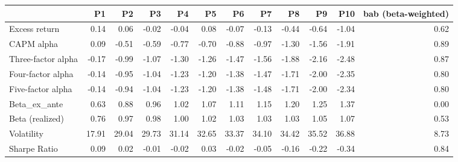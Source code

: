 \begin{tabular}{lrrrrrrrrrrr}
\toprule
{} &     P1 &     P2 &     P3 &     P4 &     P5 &     P6 &     P7 &     P8 &     P9 &    P10 &  bab (beta-weighted) \\
\midrule
Excess return      &   0.14 &   0.06 &  -0.02 &  -0.04 &   0.08 &  -0.07 &  -0.13 &  -0.44 &  -0.64 &  -1.04 &                 0.62 \\
CAPM alpha         &   0.09 &  -0.51 &  -0.59 &  -0.77 &  -0.70 &  -0.88 &  -0.97 &  -1.30 &  -1.56 &  -1.91 &                 0.89 \\
Three-factor alpha &  -0.17 &  -0.99 &  -1.07 &  -1.30 &  -1.26 &  -1.47 &  -1.56 &  -1.88 &  -2.16 &  -2.48 &                 0.87 \\
Four-factor alpha  &  -0.14 &  -0.95 &  -1.04 &  -1.23 &  -1.20 &  -1.38 &  -1.47 &  -1.71 &  -2.00 &  -2.35 &                 0.80 \\
Five-factor alpha  &  -0.14 &  -0.94 &  -1.04 &  -1.23 &  -1.20 &  -1.38 &  -1.48 &  -1.71 &  -2.00 &  -2.34 &                 0.80 \\
Beta\_ex\_ante       &   0.63 &   0.88 &   0.96 &   1.02 &   1.07 &   1.11 &   1.15 &   1.20 &   1.25 &   1.37 &                 0.00 \\
Beta (realized)    &   0.76 &   0.97 &   0.98 &   1.00 &   1.02 &   1.03 &   1.03 &   1.03 &   1.05 &   1.07 &                 0.53 \\
Volatility         &  17.91 &  29.04 &  29.73 &  31.14 &  32.65 &  33.37 &  34.10 &  34.42 &  35.52 &  36.88 &                 8.73 \\
Sharpe Ratio       &   0.09 &   0.02 &  -0.01 &  -0.02 &   0.03 &  -0.02 &  -0.05 &  -0.16 &  -0.22 &  -0.34 &                 0.84 \\
\bottomrule
\end{tabular}
